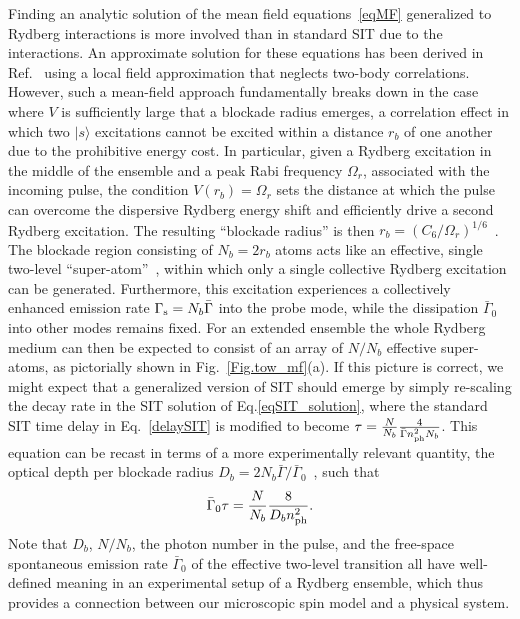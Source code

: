 \documentclass[pra,twocolumn,showpacs,preprintnumbers,amsmath,amssymb]{revtex4-1}
\begin{document}
Finding an analytic solution of the mean field equations~\eqref{eqMF} generalized to Rydberg interactions is more involved than in standard SIT due to the interactions. An approximate solution for these equations has been derived in Ref.~\cite{Rydberg-SIT} using a local field approximation that neglects two-body correlations. However, such a mean-field approach fundamentally breaks down in the case where $V$ is sufficiently large that a blockade radius emerges, a correlation effect in which two $|s\rangle$ excitations cannot be excited within a distance $r_b$ of one another due to the prohibitive energy cost. In particular, given a Rydberg excitation in the middle of the ensemble and a peak Rabi frequency $\Omega_r$, associated with the incoming pulse, the condition $V(r_b)=\Omega_r$ sets the distance at which the pulse can overcome the dispersive Rydberg energy shift and efficiently drive a second Rydberg excitation. The resulting ``blockade radius'' is then  $r_b=\left(C_6/\Omega_r\right)^{1/6}$~\cite{Lukin_Ryd}.
The blockade region consisting of $N_b=2r_b$ atoms acts like an effective, single two-level ``super-atom''~\cite{Hofferberth,Hofferberth2}, within which only a single collective Rydberg excitation can be generated. Furthermore, this excitation experiences a collectively enhanced emission rate $\Gamma_{\rm s}=N_b\bar{\Gamma}$ into the probe mode, while the dissipation $\bar{\Gamma}_0$ into other modes remains fixed.  For an extended ensemble the whole Rydberg medium can then be expected to consist of an array of $N/N_b$ effective super-atoms, as pictorially shown in Fig.~\ref{Fig.tow_mf}(a).
If this picture is correct, we might expect that a generalized version of SIT should emerge by simply re-scaling the decay rate in the  SIT solution of Eq.\eqref{eqSIT_solution}, %
where the standard SIT time delay in Eq.~\eqref{delaySIT} is modified to become $\tau=\frac{N}{N_b}\frac{4}{\bar\Gamma n^2_{\rm ph}N_b}$. This equation can be recast in terms of a more experimentally relevant quantity, the optical depth per blockade radius $D_b=2N_b\bar{\Gamma}/\bar{\Gamma}_0$~\cite{MPSJames,james_ryd}, such that
\begin{equation}\label{delayRydbergSIT}
 \bar\Gamma_0\tau=\frac{N}{N_b}\frac{8}{D_b n^2_{\rm ph}}.
\end{equation}
Note that $D_b$, $N/N_b$, the photon number in the pulse, and the free-space spontaneous emission rate $\bar{\Gamma}_0$ of the effective two-level transition all have well-defined meaning in an experimental setup of a Rydberg ensemble, which thus provides a connection between our microscopic spin model and a physical system.
\end{document}
